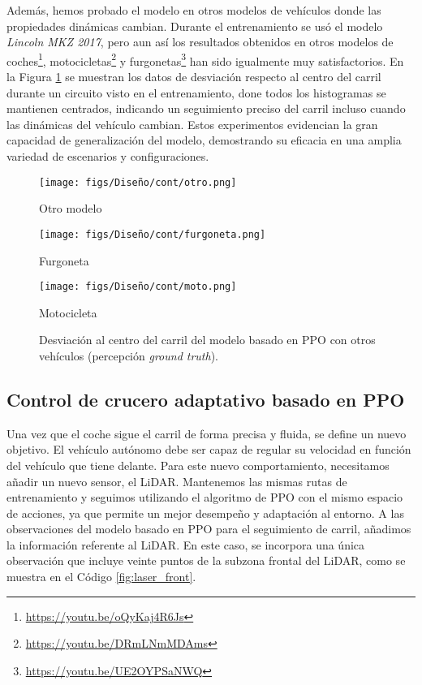 Además, hemos probado el modelo en otros modelos de vehículos donde las propiedades dinámicas cambian. Durante el entrenamiento se usó el modelo \textit{Lincoln MKZ 2017}, pero aun así los resultados obtenidos en otros modelos de coches\footnote{\url{https://youtu.be/oQyKaj4R6Js}}, motocicletas\footnote{\url{https://youtu.be/DRmLNmMDAms}} y furgonetas\footnote{\url{https://youtu.be/UE2OYPSaNWQ}} han sido igualmente muy satisfactorios. En la Figura \ref{fig:ppo_carril_din} se muestran los datos de desviación respecto al centro del carril durante un circuito visto en el entrenamiento, done todos los histogramas se mantienen centrados, indicando un seguimiento preciso del carril incluso cuando las dinámicas del vehículo cambian. Estos experimentos evidencian la gran capacidad de generalización del modelo, demostrando su eficacia en una amplia variedad de escenarios y configuraciones.
\begin{figure}[ht]
\centering
\begin{minipage}{0.32\textwidth}
    \centering
    \texttt{[image: figs/Diseño/cont/otro.png]}
    \caption{Otro modelo}
\end{minipage}%
\begin{minipage}{0.32\textwidth}
    \centering
    \texttt{[image: figs/Diseño/cont/furgoneta.png]}
    \caption{Furgoneta}
\end{minipage}%
\begin{minipage}{0.32\textwidth}
    \centering
    \texttt{[image: figs/Diseño/cont/moto.png]}
    \caption{Motocicleta}
\end{minipage}
\caption{Desviación al centro del carril del modelo basado en \ac{PPO} con otros vehículos (percepción \textit{ground truth}).}
\label{fig:ppo_carril_din}
\end{figure}

\subsection{Control de crucero adaptativo basado en \ac{PPO}}

Una vez que el coche sigue el carril de forma precisa y fluida, se define un nuevo objetivo. El vehículo autónomo debe ser capaz de regular su velocidad en función del vehículo que tiene delante. Para este nuevo comportamiento, necesitamos añadir un nuevo sensor, el \ac{LiDAR}. Mantenemos las mismas rutas de entrenamiento y seguimos utilizando el algoritmo de \ac{PPO} con el mismo espacio de acciones, ya que permite un mejor desempeño y adaptación al entorno. A las observaciones del modelo basado en \ac{PPO} para el seguimiento de carril, añadimos la información referente al \ac{LiDAR}. En este caso, se incorpora una única observación que incluye veinte puntos de la subzona frontal del \ac{LiDAR}, como se muestra en el Código \ref{fig:laser_front}.

